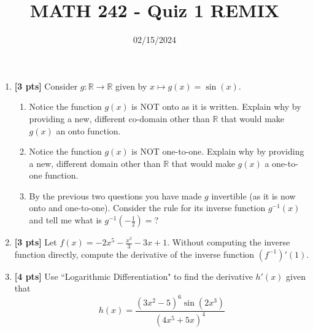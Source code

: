 \documentclass[12pt]{article}
\title{MATH 242 - Quiz 1 REMIX}
\date{02/15/2024}
\begin{document}
\maketitle


\begin{enumerate}

\item \textbf{[3 pts]} Consider $g:\mathbb{R}\to\mathbb{R}$ given by $x\mapsto g(x)=\sin(x)$. 

\begin{enumerate}
    \item Notice the function $g(x)$ is NOT onto as it is written. Explain why by providing a new, different co-domain other than $\mathbb{R}$ that would make $g(x)$ an onto function.
    \vspace{1.25cm}
    \item Notice the function $g(x)$ is NOT one-to-one. Explain why by providing a new, different domain other than $\mathbb{R}$ that would make $g(x)$ a one-to-one function.
    \vspace{1.25cm}
    \item By the previous two questions you have made $g$ invertible (as it is now onto and one-to-one). Consider the rule for its inverse function $g^{-1}(x)$ and tell me what is $g^{-1}(-\frac{1}{2})=$?
    \vspace{1.25cm}
\end{enumerate}


\item \textbf{[3 pts]} Let $f(x)=-2x^5-\frac{x^3}{3}-3x+1$. Without computing the inverse function directly, compute the derivative of the inverse function $(f^{-1})'(1)$.

\vfill

\pagebreak

\item \textbf{[4 pts]} Use ``Logarithmic Differentiation" to find the derivative $h'(x)$ given that
$$h(x)=\frac{(3x^2-5)^6\sin(2x^3)}{(4x^5+5x)^4}$$
\end{enumerate}
\end{document}
